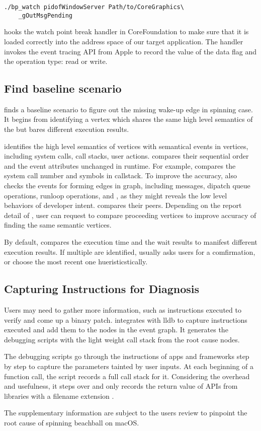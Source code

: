 \begin{lstlisting}
./bp_watch pidofWindowServer Path/to/CoreGraphics\
	_gOutMsgPending
\end{lstlisting}

\xxx hooks the watch point break handler in CoreFoundation to make sure that it is
loaded correctly into the address space of our target application. The handler
invokes the event tracing API from Apple to record the value of the data flag
and the operation type: read or write.

\subsection{Find baseline scenario}

\xxx finds a baseline scenario to figure out the missing wake-up edge in
spinning case. It begins from identifying a vertex which shares
the same high level semantics of the \spinningnode but bares
different execution results. 


\xxx identifies the high level semantics of vertices with semantical events
in vertices, including system calls, call stacks, user actions. \xxx compares
their sequential order and the event attributes unchanged in runtime. For
example, \xxx compares the system call number and symbols in callstack.
To improve the accuracy, \xxx also checks the events for forming edges in
graph, including messages, dipatch queue operations, runloop operations,
\dataflagread and \dataflagwrite, as they might reveals the low level behaviors
of developer intent. \xxx compares their peers. Depending on the report detail
of \spinningnode, user can request \xxx to compare proceeding vertices to
improve accuracy of finding the same semantic vertices.

By default, \xxx compares the execution time and the wait results to manifest
different execution results. If multiple \similarnode are identified,
\xxx usually asks users for a comfirmation, or choose the most recent one
hueristicstically.

\subsection{Capturing Instructions for Diagnosis}

Users may need to gather more information, such as instructions executed to
verify and come up a binary patch. \xxx integrates with lldb to capture
instructions executed and add them to the nodes in the event graph. It generates
the debugging scripts with the light weight call stack from the root cause
nodes.

The debugging scripts go through the instructions of apps and frameworks step
by step to capture the parameters tainted by user inputs. At each beginning of
a function call, the script records a full call stack for it. Considering the
overhead and usefulness, it steps over and only records the return value of APIs
from libraries with a filename extension \vv{.dylib}.

The supplementary information are subject to the users review to pinpoint the
root cause of spinning beachball on macOS.

